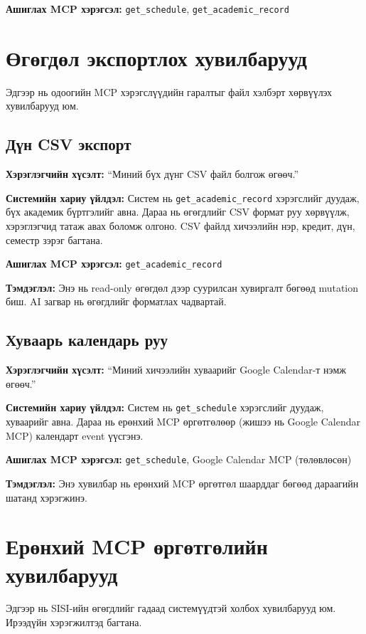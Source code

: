 \textbf{Ашиглах MCP хэрэгсэл:} \texttt{get\_schedule}, \texttt{get\_academic\_record}

\section{Өгөгдөл экспортлох хувилбарууд}

Эдгээр нь одоогийн MCP хэрэгслүүдийн гаралтыг файл хэлбэрт хөрвүүлэх хувилбарууд юм.

\subsection{Дүн CSV экспорт}

\textbf{Хэрэглэгчийн хүсэлт:} ``Миний бүх дүнг CSV файл болгож өгөөч.''

\textbf{Системийн хариу үйлдэл:} Систем нь \texttt{get\_academic\_record} хэрэгслийг дуудаж, бүх академик бүртгэлийг авна. Дараа нь өгөгдлийг CSV формат руу хөрвүүлж, хэрэглэгчид татаж авах боломж олгоно. CSV файлд хичээлийн нэр, кредит, дүн, семестр зэрэг багтана.

\textbf{Ашиглах MCP хэрэгсэл:} \texttt{get\_academic\_record}

\textbf{Тэмдэглэл:} Энэ нь read-only өгөгдөл дээр суурилсан хувиргалт бөгөөд mutation биш. AI загвар нь өгөгдлийг форматлах чадвартай.

\subsection{Хуваарь календарь руу}

\textbf{Хэрэглэгчийн хүсэлт:} ``Миний хичээлийн хуваарийг Google Calendar-т нэмж өгөөч.''

\textbf{Системийн хариу үйлдэл:} Систем нь \texttt{get\_schedule} хэрэгслийг дуудаж, хуваарийг авна. Дараа нь ерөнхий MCP өргөтгөлөөр (жишээ нь Google Calendar MCP) календарт event үүсгэнэ.

\textbf{Ашиглах MCP хэрэгсэл:} \texttt{get\_schedule}, Google Calendar MCP (төлөвлөсөн)

\textbf{Тэмдэглэл:} Энэ хувилбар нь ерөнхий MCP өргөтгөл шаарддаг бөгөөд дараагийн шатанд хэрэгжинэ.

\section{Ерөнхий MCP өргөтгөлийн хувилбарууд}

Эдгээр нь SISI-ийн өгөгдлийг гадаад системүүдтэй холбох хувилбарууд юм. Ирээдүйн хэрэгжилтэд багтана.

